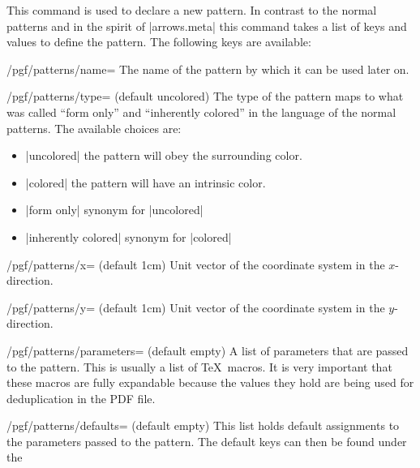 \begin{command}{\pgfdeclarepattern{}}
    This command is used to declare a new pattern. In contrast to the normal
    patterns and in the spirit of |arrows.meta| this command takes a list of
    keys and values to define the pattern. The following keys are available:
    \begin{key}{/pgf/patterns/name=}
        The name of the pattern by which it can be used later on.
    \end{key}
    \begin{key}{/pgf/patterns/type= (default uncolored)}
        The type of the pattern maps to what was called ``form only'' and
        ``inherently colored'' in the language of the normal patterns. The
        available choices are:
        \begin{itemize}
            \item |uncolored| the pattern will obey the surrounding color.
            \item |colored| the pattern will have an intrinsic color.
            \item |form only| synonym for |uncolored|
            \item |inherently colored| synonym for |colored|
        \end{itemize}
    \end{key}
    \begin{key}{/pgf/patterns/x= (default 1cm)}
        Unit vector of the coordinate system in the $x$-direction.
    \end{key}
    \begin{key}{/pgf/patterns/y= (default 1cm)}
        Unit vector of the coordinate system in the $y$-direction.
    \end{key}
    \begin{key}{/pgf/patterns/parameters= (default empty)}
        A list of parameters that are passed to the pattern. This is usually a
        list of \TeX\ macros. It is very important that these macros are fully
        expandable because the values they hold are being used for
        deduplication in the PDF file.
    \end{key}
    \begin{key}{/pgf/patterns/defaults= (default empty)}
        This list holds default assignments to the parameters passed to the
        pattern. The default keys can then be found under the

\end{key}
\end{command}
